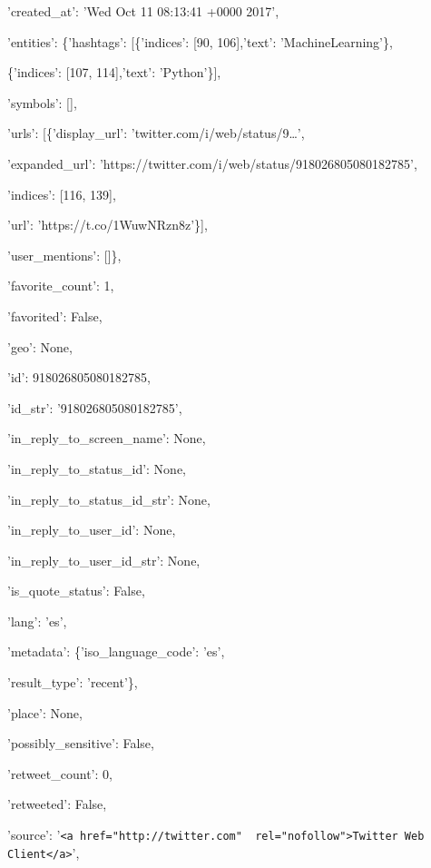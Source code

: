 \quad'created\_at': 'Wed Oct 11 08:13:41 +0000 2017',

\quad'entities': \{'hashtags': [\{'indices': [90, 106],'text': 'MachineLearning'\},

				  \hspace{4cm}\{'indices': [107, 114],'text': 'Python'\}],

	\hspace{2cm} 'symbols': [],

	\hspace{2cm}'urls': [\{'display\_url': 'twitter.com/i/web/status/9…',

				\hspace{3cm}'expanded\_url': 'https://twitter.com/i/web/status/918026805080182785',

				\hspace{3cm}'indices': [116, 139],

				\hspace{3cm}'url': 'https://t.co/1WuwNRzn8z'\}],

	\hspace{2cm}'user\_mentions': []\},

\quad'favorite\_count': 1,

\quad'favorited': False,

\quad'geo': None,

\quad'id': 918026805080182785,

\quad'id\_str': '918026805080182785',

\quad'in\_reply\_to\_screen\_name': None,

\quad'in\_reply\_to\_status\_id': None,

\quad'in\_reply\_to\_status\_id\_str': None,

\quad'in\_reply\_to\_user\_id': None,

\quad'in\_reply\_to\_user\_id\_str': None,

\quad'is\_quote\_status': False,

\quad'lang': 'es',

\quad'metadata': \{'iso\_language\_code': 'es',

	 \hspace{2.3cm}'result\_type': 'recent'\},

\quad'place': None,

\quad'possibly\_sensitive': False,

\quad'retweet\_count': 0,

\quad'retweeted': False,

\quad'source': '\verb|<a href="http://twitter.com"  rel="nofollow">Twitter Web Client</a>|',

